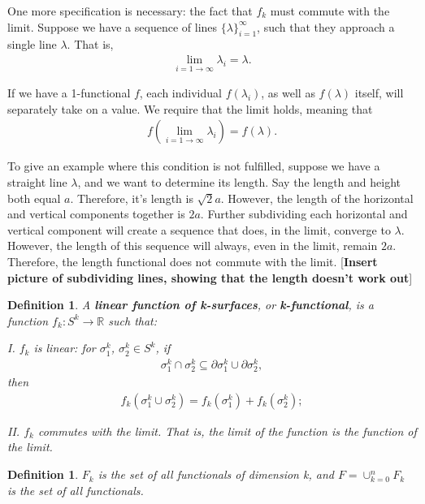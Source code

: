 \documentclass{book}
\newtheorem{defn}[equation]{Definition}
\begin{document}
One more specification is necessary: the fact that $f_k$ must commute with the limit. Suppose we have a sequence of lines \textbf{$\{\lambda\}_{i=1}^\infty$}, such that they approach a single line $\lambda$. That is, \begin{gather} \lim_{i = 1 \to \infty} \lambda_i = \lambda. \end{gather} 

If we have a 1-functional $f$, each individual $f(\lambda_i)$, as well as $f(\lambda)$ itself, will separately take on a value. We require that the limit holds, meaning that \begin{gather}  f\left(\lim_{i = 1 \to \infty} \lambda_i\right) = f(\lambda). \end{gather}

To give an example where this condition is not fulfilled, suppose we have a straight line $\lambda$, and we want to determine its length. Say the length and height both equal $a$. Therefore, it's length is $\sqrt{2}a$. However, the length of the horizontal and vertical components together is $2a$. Further subdividing each horizontal and vertical component will create a sequence that does, in the limit, converge to $\lambda$. However, the length of this sequence will always, even in the limit, remain $2a$. Therefore, the length functional does not commute with the limit. [\textbf{Insert picture of subdividing lines, showing that the length doesn't work out}]


\begin{defn}
	A \textbf{linear function of k-surfaces}, or \textbf{k-functional}, is a function $f_k : S^k \to \mathbb{R}$ such that:
	
	I. $f_k$ is linear: for $\sigma^k_1$, $\sigma^k_2 \in S^k$, if \begin{gather}\sigma^k_1 \cap \sigma^k_2 \subseteq \partial \sigma^k_1 \cup \partial \sigma^k_2,\end{gather} then \begin{gather}f_k(\sigma^k_1\cup \sigma^k_2) = f_k(\sigma^k_1) + f_k(\sigma^k_2); \end{gather}
	
	II. $f_k$ commutes with the limit. That is, the limit of the function is the function of the limit. 
\end{defn}



\begin{defn}
	$F_k$ is the set of all functionals of dimension k, and $F = \cup_{k=0}^nF_k$ is the set of all functionals. 
\end{defn}
\end{document}
